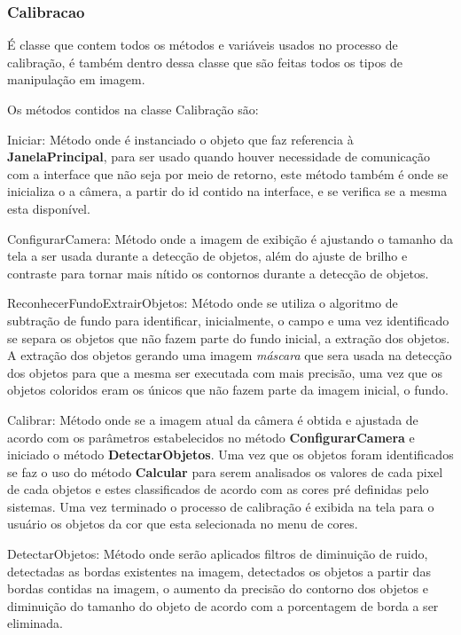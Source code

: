 \subsubsection{Calibracao}
 É classe que contem todos os métodos e variáveis usados no processo de calibração, é também dentro dessa classe que são feitas todos os tipos de manipulação em imagem.
 
Os métodos contidos na classe Calibração são:
	\begin{description}

\item Iniciar: Método onde é instanciado o objeto que faz referencia à \textbf{JanelaPrincipal}, para ser usado quando houver necessidade de comunicação com a interface que não seja por meio de retorno, este método também é onde se inicializa o a câmera, a partir do id contido na interface, e se verifica se a mesma esta disponível.


\item ConfigurarCamera: Método onde a imagem de exibição é ajustando o tamanho da tela a ser usada durante a detecção de objetos, além do ajuste de brilho e contraste para tornar mais nítido os contornos durante a detecção de objetos.	
	
  \item ReconhecerFundoExtrairObjetos: Método onde se utiliza o algoritmo de subtração de fundo para identificar, inicialmente, o campo e uma vez identificado se separa os objetos que não fazem parte do fundo inicial, a extração dos objetos. A extração dos objetos gerando uma imagem \textit{máscara} que sera usada na detecção dos objetos para que a mesma ser executada com mais precisão, uma vez que os objetos coloridos eram os únicos que não fazem parte da imagem inicial, o fundo.
  
 
	\item Calibrar: Método onde se a imagem atual da câmera é obtida e ajustada de acordo com os parâmetros estabelecidos no método \textbf{ConfigurarCamera} e iniciado o método \textbf{DetectarObjetos}. Uma vez que os objetos foram identificados se faz o uso do método \textbf{Calcular}  para serem analisados os valores de cada pixel de cada objetos e estes classificados de acordo com as cores pré definidas pelo sistemas. Uma vez terminado o processo de calibração é exibida na tela para o usuário os objetos da cor que esta selecionada no menu de cores.			
		
	\item DetectarObjetos: Método onde serão aplicados filtros de diminuição de ruido, detectadas as bordas existentes na imagem, detectados os objetos a partir das bordas contidas na imagem, o aumento da precisão do contorno dos objetos e diminuição do tamanho do objeto de acordo com a porcentagem de borda a ser eliminada. 


\end{description}
